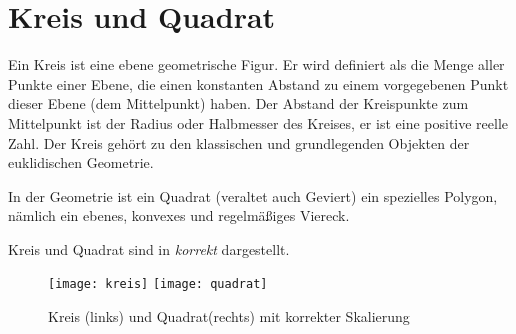 \section{Kreis und Quadrat}
Ein Kreis ist eine ebene geometrische Figur. Er wird definiert als die
Menge aller Punkte einer Ebene, die einen konstanten Abstand zu einem
vorgegebenen Punkt dieser Ebene (dem Mittelpunkt) haben. Der Abstand
der Kreispunkte zum Mittelpunkt ist der Radius oder Halbmesser des
Kreises, er ist eine positive reelle Zahl. Der Kreis gehört zu den
klassischen und grundlegenden Objekten der euklidischen Geometrie.

In der Geometrie ist ein Quadrat (veraltet auch Geviert) ein
spezielles Polygon, nämlich ein ebenes, konvexes und regelmäßiges
Viereck.

Kreis und Quadrat sind in 
\emph{korrekt} dargestellt.
%
\begin{figure}[ht]
  \centering
  \texttt{[image: kreis]}
  \texttt{[image: quadrat]}
  \caption{Kreis (links) und Quadrat(rechts) mit korrekter Skalierung}
  \label{fig:kreis_quadrat}
\end{figure}
%
